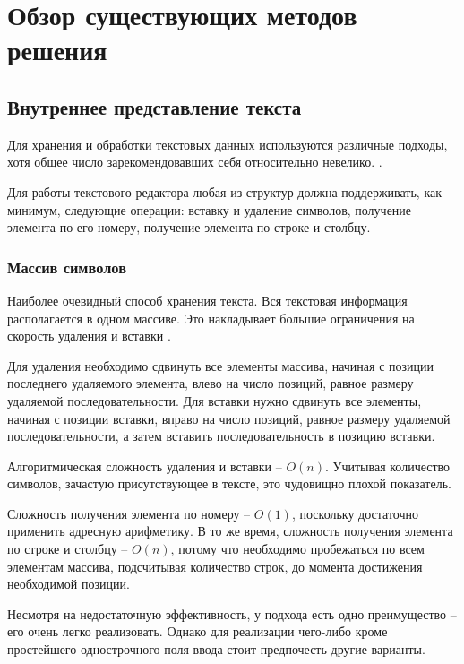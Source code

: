 \documentclass{fefu}
\begin{document}
	\section{Обзор существующих методов решения}
		\subsection{Внутреннее представление текста}
			\par Для хранения и обработки текстовых данных используются различные подходы,
				хотя общее число зарекомендовавших себя относительно невелико.
				\cite{TextEditorDataStructures}.
			\par Для работы текстового редактора любая из структур должна поддерживать, как 
			минимум, следующие операции: вставку и удаление символов, получение элемента по его
			номеру, получение элемента по строке и столбцу.
			\subsubsection{Массив символов}
				\par Наиболее очевидный способ хранения текста. Вся текстовая информация
				располагается в одном массиве. Это накладывает большие ограничения на скорость
				удаления и вставки \cite{StringsReference}. 
				\par Для удаления необходимо сдвинуть все элементы массива, начиная с позиции
				последнего удаляемого элемента, влево на число позиций, равное размеру
				удаляемой последовательности. Для вставки нужно сдвинуть все элементы, начиная
				с позиции вставки, вправо на число позиций, равное размеру удаляемой
				последовательности, а затем вставить последовательность в позицию вставки.
				\par Алгоритмическая сложность удаления и вставки -- $O(n)$. Учитывая 
				количество символов, зачастую присутствующее в тексте, это чудовищно плохой 
				показатель.
				\par Сложность получения элемента по номеру -- $O(1)$, поскольку достаточно
				применить адресную арифметику. В то же время, сложность получения элемента по
				строке и столбцу -- $O(n)$, потому что необходимо пробежаться по всем элементам
				массива, подсчитывая количество строк, до момента достижения необходимой
				позиции.
				\par Несмотря на недостаточную эффективность, у подхода есть одно преимущество
				-- его очень легко реализовать. Однако для реализации чего-либо кроме
				простейшего однострочного поля ввода стоит предпочесть другие варианты.
\end{document}
